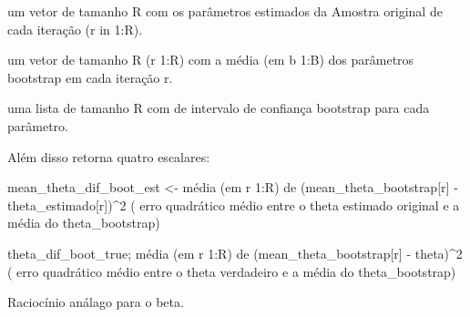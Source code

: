 \documentclass[11pt]{article}
\begin{document}
um vetor de tamanho R com os parâmetros estimados da Amostra original de
cada iteração (r in 1:R).

um vetor de tamanho R (r 1:R) com a média (em b 1:B) dos parâmetros
bootstrap em cada iteração r.

uma lista de tamanho R com de intervalo de confiança bootstrap para cada
parâmetro.

Além disso retorna quatro escalares:

mean\_theta\_dif\_boot\_est \textless- média (em r 1:R) de
(mean\_theta\_bootstrap{[}r{]} - theta\_estimado{[}r{]})\^{}2 ( erro
quadrático médio entre o theta estimado original e a média do
theta\_bootstrap)

theta\_dif\_boot\_true; média (em r 1:R) de
(mean\_theta\_bootstrap{[}r{]} - theta)\^{}2 ( erro quadrático médio
entre o theta verdadeiro e a média do theta\_bootstrap)

Raciocínio análago para o beta.
\end{document}

